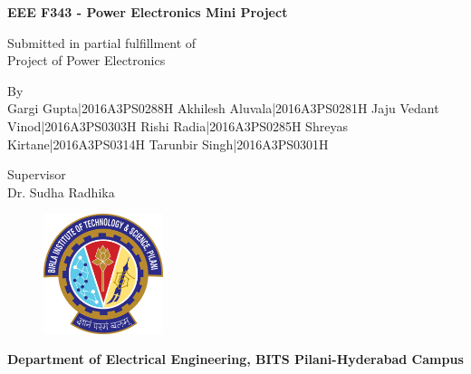 \begin{titlepage}
	\thispagestyle{empty}
	\begin{center}
	\vspace{0.25cm}


	\Huge
	\textbf{EEE F343 - Power Electronics \newline Mini Project}

	\vspace{1cm}

	{\Large Submitted in partial fulfillment of}\\
	{\Large Project of Power Electronics}\\
\vspace{0.25cm}

\Large
By\\
Gargi Gupta|2016A3PS0288H\newline
Akhilesh Aluvala|2016A3PS0281H \newline
Jaju Vedant Vinod|2016A3PS0303H \newline
Rishi Radia|2016A3PS0285H \newline
Shreyas Kirtane|2016A3PS0314H \newline
Tarunbir Singh|2016A3PS0301H\newline
\vspace{0.25cm}

\Large
Supervisor\\
Dr. Sudha Radhika

\vfill

\begin{figure}[H]
\centering
\includegraphics[width=35mm]{images/logo}
\end{figure}

\Large
\textbf{Department of Electrical Engineering, BITS Pilani-Hyderabad Campus}

	\end{center}

\end{titlepage}
